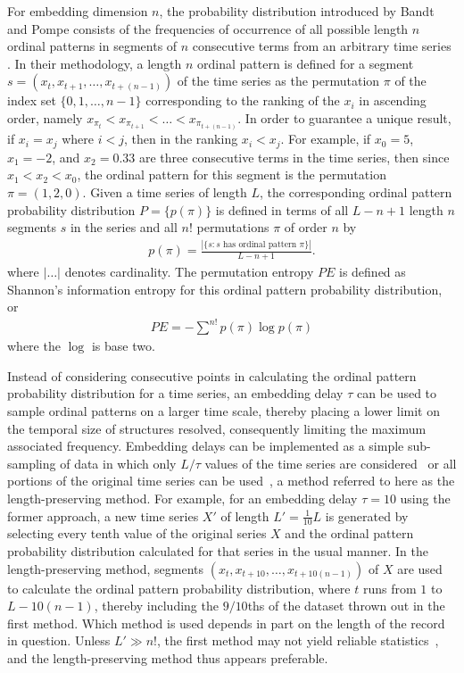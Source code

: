 \documentclass[aps,prx,twocolumn,secnumarabic,nobalancelastpage,amsmath,amssymb,
nofootinbib]{revtex4-1}
\begin{document}
For embedding dimension $n$, the probability distribution introduced by Bandt and Pompe consists of the frequencies of occurrence of all possible length $n$ ordinal patterns in segments of $n$ consecutive terms from an arbitrary time series \cite{bandt2002}. In their methodology, a length $n$ ordinal pattern is defined for a segment $s = ( x_t,x_{t+1},\ldots,x_{t+(n-1)} )$ of the time series as the permutation $\pi$ of the index set $\{0,1,\ldots,n-1 \}$ corresponding to the ranking of the $x_i$ in ascending order, namely $x_{\pi_t}< x_{\pi_{t+1}}<\ldots< x_{\pi_{t+(n-1)}}$. In order to guarantee a unique result, if $x_i = x_j$ where $i<j$, then in the ranking $x_i <x_j$. For example, if $x_0 = 5$,  $x_1= -2$,  and $x_2 = 0.33$ are three consecutive terms in the time series, then since $x_1 < x_2 < x_0$, the ordinal pattern for this segment is the permutation $\pi = (1,2,0)$.  Given a time series of length $L$, the corresponding ordinal pattern probability distribution $P= \{p(\pi) \}$ is defined in terms of all $L-n+1$ length $n$ segments $s$ in the series and all $n!$ permutations $\pi$ of order $n$ by
\begin{align}
p(\pi) = \frac{|\{s: \text{$s$ has ordinal pattern $\pi$}\}| }{L-n+1}. 
\end{align}
where $|\ldots|$ denotes cardinality. The permutation entropy $PE$ is defined as Shannon's information entropy for this ordinal pattern probability distribution, or
\begin{align}
PE  = -\sum^{n!} p(\pi) \log p(\pi)
\end{align}
where the $\log$ is base two.

Instead of considering consecutive points in calculating the ordinal pattern probability distribution for a time series, an embedding delay $\tau$ can be used to sample ordinal patterns on a larger time scale, thereby placing a lower limit on the temporal size of structures resolved, consequently limiting the maximum associated frequency. Embedding delays can be implemented as a simple sub-sampling of data in which only $L/\tau$ values of the time series are considered~\cite{maggs2013,gekelman2014} or all portions of the original time series can be used~\cite{bandt2005}, a method referred to here as the length-preserving method. For example, for an embedding delay $\tau=10$ using the former approach, a new time series $X'$ of length $L'=\frac{1}{10}L$ is generated by selecting every tenth value of the original series $X$ and the ordinal pattern probability distribution calculated for that series in the usual manner. In the length-preserving method, segments $ ( x_t,x_{t+10},\ldots,x_{t+10(n-1)} ) $ of $X$ are used to calculate the ordinal pattern probability distribution, where $t$ runs from $1$ to $L-10(n-1)$, thereby including the $9/10$ths of the dataset thrown out in the first method. Which method is used depends in part on the length of the record in question. Unless  $L' \gg n!$, the first method may not yield reliable statistics~\cite{gekelman2014}, and the length-preserving method thus appears preferable.
\end{document}
